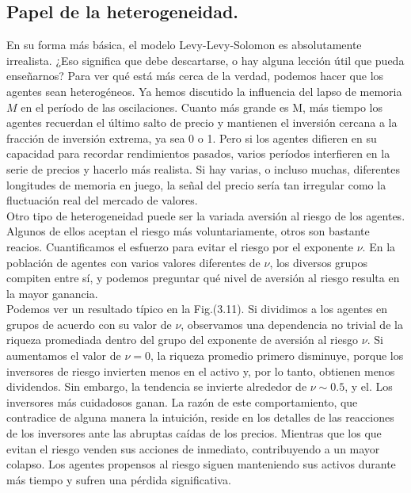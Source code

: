 \documentclass[12pt,a4paper]{article}
\begin{document}
\subsection*{Papel de la heterogeneidad.}
\quad En su forma más básica, el modelo Levy-Levy-Solomon es absolutamente irrealista. ¿Eso significa que debe descartarse, o hay alguna lección útil que pueda enseñarnos? Para ver qué está más cerca de la verdad, podemos hacer que los agentes sean heterogéneos. Ya hemos discutido la influencia del lapso de memoria $ M $ en el período de las oscilaciones. Cuanto más grande es M, más tiempo los agentes recuerdan el último salto de precio y mantienen el
inversión cercana a la fracción de inversión extrema, ya sea 0 o 1. Pero si los agentes difieren en su capacidad para recordar rendimientos pasados, varios períodos interfieren en la serie de precios
y hacerlo más realista. Si hay varias, o incluso muchas, diferentes longitudes de memoria en juego, la señal del precio sería tan irregular como la fluctuación real del mercado de valores.\\
\quad Otro tipo de heterogeneidad puede ser la variada aversión al riesgo de los agentes. Algunos de ellos aceptan el riesgo más voluntariamente, otros son bastante reacios. Cuantificamos el esfuerzo para evitar el riesgo por el exponente $\nu$. En la población de agentes con varios valores diferentes de $\nu$, los diversos grupos compiten entre sí, y podemos preguntar qué nivel de aversión al riesgo resulta en la mayor ganancia.\\
\quad Podemos ver un resultado típico en la Fig.(3.11). Si dividimos a los agentes en grupos de acuerdo con su valor de $\nu$, observamos una dependencia no trivial de la riqueza promediada dentro del grupo del exponente de aversión al riesgo $\nu$. Si aumentamos el valor de $\nu = 0$, la riqueza promedio primero disminuye, porque los inversores de riesgo invierten menos en el activo y, por lo tanto, obtienen menos dividendos. Sin embargo, la tendencia se invierte alrededor de $ \nu \sim 0.5 $, y el. Los inversores más cuidadosos ganan. La razón de este comportamiento, que contradice de alguna manera la intuición, reside en los detalles de las reacciones de los inversores ante las abruptas caídas de los precios. Mientras que los que evitan el riesgo venden sus acciones de inmediato, contribuyendo a un mayor colapso. Los agentes propensos al riesgo siguen manteniendo sus activos durante más tiempo y sufren una pérdida significativa.\\
\end{document}
